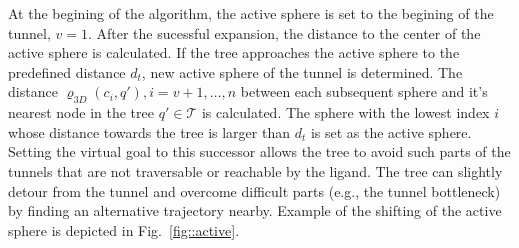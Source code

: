 \documentclass{bmcart}
\def\T{\mathcal{T}}
\def\dtg{d_{t}}
\def\distt{\varrho_{3D}}
\begin{document}
At the begining of the algorithm, the active sphere is set to the begining of the tunnel, $v=1$.
After the sucessful expansion, the distance to the center of the active sphere is calculated.
If the tree approaches the active sphere to the predefined distance $\dtg$, new active sphere of the tunnel is determined.
The distance $\distt(c_i, q'), i=v+1,\ldots,n$ between each subsequent sphere and it's nearest node in the tree $q' \in \T$ 
is calculated. 
The sphere with the lowest index $i$ whose distance towards the tree is larger than $\dtg$ is set as the active sphere.
Setting the virtual goal to this successor allows the tree to avoid such parts of the tunnels that are not traversable or reachable by the ligand.
The tree can slightly detour from the tunnel and overcome difficult parts (e.g., the tunnel bottleneck) by finding an alternative trajectory nearby.
Example of the shifting of the active sphere is depicted in Fig.~\ref{fig::active}.
\end{document}
